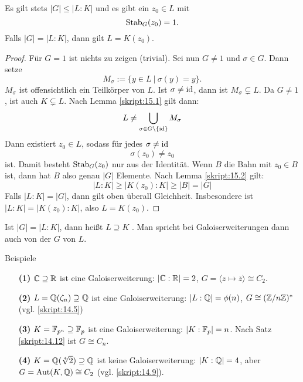 \begin{lemma}\label{skript:15.3}
	Es gilt stets $|G|\leq|L:K|$ und es gibt ein $z_0\in L$ mit
	\[\operatorname{Stab}_G(z_0)=1.\]
	Falls $|G|=|L:K|$, dann gilt $L=K(z_0)$.
\end{lemma}
\begin{proof}
	Für $G=1$ ist nichts zu zeigen (trivial). Sei nun $G\neq1$ und $\sigma\in G$. Dann setze
	\[M_\sigma:=\{y\in L\ |\ \sigma(y)=y\}.\]
	$M_\sigma$ ist offensichtlich ein Teilkörper von $L$. Ist $\sigma\neq\operatorname{id}$, dann ist $M_\sigma\subsetneq L$. Da $G\neq1$, ist auch $K\subsetneq L$. Nach Lemma \ref{skript:15.1} gilt dann:
	\[L\neq\bigcup_{\sigma\in G\backslash\{\operatorname{id}\}} M_\sigma\]
	Dann existiert $z_0\in L$, sodass für jedes $\sigma\neq\operatorname{id}$
	\[\sigma(z_0)\neq z_0\]
	ist. Damit besteht $\operatorname{Stab}_G(z_0)$ nur aus der Identität. Wenn $B$ die Bahn mit $z_0\in B$ ist, dann hat $B$ also genau $|G|$ Elemente. Nach Lemma \ref{skript:15.2} gilt:
	\[|L:K|\geq|K(z_0):K|\geq|B|=|G|\]
	Falls $|L:K|=|G|$, dann gilt oben überall Gleichheit. Insbesondere ist $|L:K|=|K(z_0):K|$, also $L=K(z_0)$.
\end{proof}

\begin{df}\label{skript:15.4}
	Ist $|G|=|L:K|$, dann heißt $L\supseteq K$ . Man spricht bei Galoiserweiterungen dann auch von der  $G$ von $L$.
\end{df}

\begin{genericdf}{Beispiele}\label{skript:15.5}
	\begin{itemize}
		\item[\textbf{(1)}]
		$\mathbb{C}\supseteq\mathbb{R}$ ist eine Galoiserweiterung: $|\mathbb{C}:\mathbb{R}|=2$, $G=\langle z\mapsto\overline{z}\rangle\cong C_2$.
		\item[\textbf{(2)}]
		$L=\mathbb{Q}(\zeta_n)\supseteq\mathbb{Q}$ ist eine Galoiserweiterung: $|L:\mathbb{Q}|=\phi(n)$, $G\cong(\mathbb{Z}/n\mathbb{Z})^\ast$ (vgl. \ref{skript:14.5})
		\item[\textbf{(3)}]
		$K=\mathbb{F}_{p^n}\supseteq\mathbb{F}_p$ ist eine Galoiserweiterung: $|K:\mathbb{F}_p|=n$. Nach Satz \ref{skript:14.12} ist $G\cong C_n$.
		\item[\textbf{(4)}]
		$K=\mathbb{Q}(\sqrt[4]{2})\supseteq\mathbb{Q}$ ist keine Galoiserweiterung: $|K:\mathbb{Q}|=4$, aber $G=\operatorname{Aut}(K,\mathbb{Q})\cong C_2$ (vgl. \ref{skript:14.9}).
	\end{itemize}
\end{genericdf}

